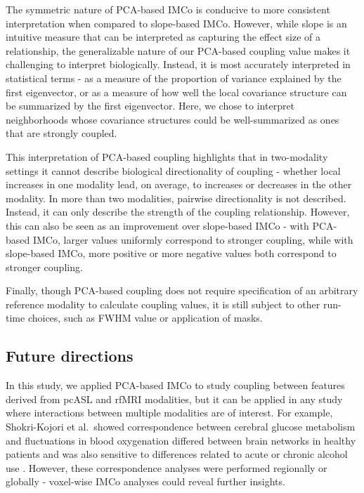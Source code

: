 \documentclass[
  12pt,
]{article}
\begin{document}
The symmetric nature of PCA-based IMCo is conducive to more consistent interpretation when compared to slope-based IMCo. However, while slope is an intuitive measure that can be interpreted as capturing the effect size of a relationship, the generalizable nature of our PCA-based coupling value makes it challenging to interpret biologically. Instead, it is most accurately interpreted in statistical terms - as a measure of the proportion of variance explained by the first eigenvector, or as a measure of how well the local covariance structure can be summarized by the first eigenvector. Here, we chose to interpret neighborhoods whose covariance structures could be well-summarized as ones that are strongly coupled.

This interpretation of PCA-based coupling highlights that in two-modality settings it cannot describe biological directionality of coupling - whether local increases in one modality lead, on average, to increases or decreases in the other modality. In more than two modalities, pairwise directionality is not described. Instead, it can only describe the strength of the coupling relationship. However, this can also be seen as an improvement over slope-based IMCo - with PCA-based IMCo, larger values uniformly correspond to stronger coupling, while with slope-based IMCo, more positive or more negative values both correspond to stronger coupling.

Finally, though PCA-based coupling does not require specification of an arbitrary reference modality to calculate coupling values, it is still subject to other run-time choices, such as FWHM value or application of masks.

\hypertarget{future-directions}{%
\subsection{Future directions}\label{future-directions}}

In this study, we applied PCA-based IMCo to study coupling between features derived from pcASL and rfMRI modalities, but it can be applied in any study where interactions between multiple modalities are of interest. For example, Shokri-Kojori et al.~showed correspondence between cerebral glucose metabolism and fluctuations in blood oxygenation differed between brain networks in healthy patients and was also sensitive to differences related to acute or chronic alcohol use \citep{shokri-kojoriCorrespondenceCerebralGlucose2019}. However, these correspondence analyses were performed regionally or globally - voxel-wise IMCo analyses could reveal further insights.
\end{document}
